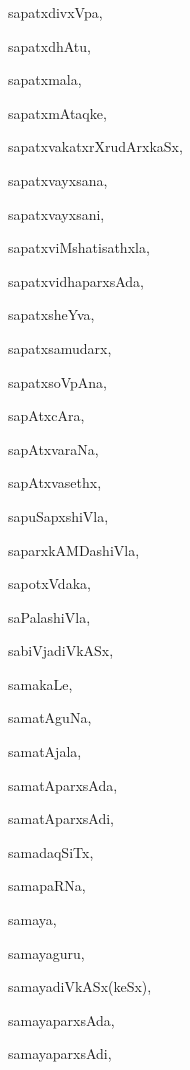 \begin{multicols}{2}
{sapatxdivxVpa}, \pageref{sapatxdivxVpa}

{sapatxdhAtu}, \pageref{sapatxdhAtu}

{sapatxmala}, \pageref{sapatxmala}

{sapatxmAtaqke}, \pageref{sapatxmAtaqke1}

{sapatxvakatxrXrudArxkaSx}, \pageref{sapatxvakatxrXrudArxkaSx}

{sapatxvayxsana}, \pageref{sapatxvayxsana}

{sapatxvayxsani}, \pageref{sapatxvayxsani}

{sapatxviMshatisathxla}, \pageref{sapatxviMshatisathxla}

{sapatxvidhaparxsAda}, \pageref{sapatxvidhaparxsAda}

{sapatxsheYva}, \pageref{sapatxsheYva}

{sapatxsamudarx}, \pageref{sapatxsamudarx}

{sapatxsoVpAna}, \pageref{sapatxsoVpAna}

{sapAtxcAra}, \pageref{sapAtxcAra}

{sapAtxvaraNa}, \pageref{sapAtxvaraNa}

{sapAtxvasethx}, \pageref{sapAtxvasethx}

{sapuSapxshiVla}, \pageref{sapuSapxshiVla}

{saparxkAMDashiVla}, \pageref{saparxkAMDashiVla}

{sapotxVdaka}, \pageref{sapotxVdaka}

{saPalashiVla}, \pageref{saPalashiVla}

{sabiVjadiVkASx}, \pageref{sabiVjadiVkASx}

{samakaLe}, \pageref{samakaLe}

{samatAguNa}, \pageref{samatAguNa}

{samatAjala}, \pageref{samatAjala}

{samatAparxsAda}, \pageref{samatAparxsAda}

{samatAparxsAdi}, \pageref{samatAparxsAdi}

{samadaqSiTx}, \pageref{samadaqSiTx}

{samapaRNa}, \pageref{samapaRNa}

{samaya}, \pageref{samaya}

{samayaguru}, \pageref{samayaguru}

{samayadiVkASx(keSx)}, \pageref{samayadiVkASxkeSx}

{samayaparxsAda}, \pageref{samayaparxsAda}

{samayaparxsAdi}, \pageref{samayaparxsAdi}


\end{multicols}
